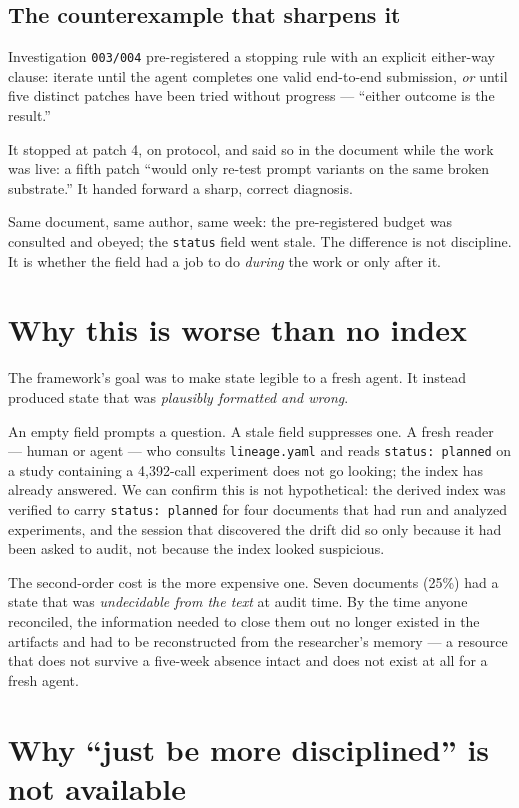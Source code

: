 \documentclass[11pt]{article}
\begin{document}
\subsection{The counterexample that sharpens it}

Investigation \texttt{003/004} pre-registered a stopping rule with an
explicit either-way clause: iterate until the agent completes one valid
end-to-end submission, \emph{or} until five distinct patches have been tried
without progress --- ``either outcome is the result.''

It stopped at patch 4, on protocol, and said so in the document while the
work was live: a fifth patch ``would only re-test prompt variants on the
same broken substrate.'' It handed forward a sharp, correct diagnosis.

Same document, same author, same week: the pre-registered budget was
consulted and obeyed; the \texttt{status} field went stale. The difference
is not discipline. It is whether the field had a job to do \emph{during} the
work or only after it.

\section{Why this is worse than no index}

The framework's goal was to make state legible to a fresh agent. It instead
produced state that was \emph{plausibly formatted and wrong}.

An empty field prompts a question. A stale field suppresses one. A fresh
reader --- human or agent --- who consults \texttt{lineage.yaml} and reads
\texttt{status: planned} on a study containing a 4{,}392-call experiment
does not go looking; the index has already answered. We can confirm this is
not hypothetical: the derived index was verified to carry
\texttt{status: planned} for four documents that had run and analyzed
experiments, and the session that discovered the drift did so only because
it had been asked to audit, not because the index looked suspicious.

The second-order cost is the more expensive one. Seven documents (25\%) had
a state that was \emph{undecidable from the text} at audit time. By the time
anyone reconciled, the information needed to close them out no longer
existed in the artifacts and had to be reconstructed from the researcher's
memory --- a resource that does not survive a five-week absence intact and
does not exist at all for a fresh agent.

\section{Why ``just be more disciplined'' is not available}
\end{document}
